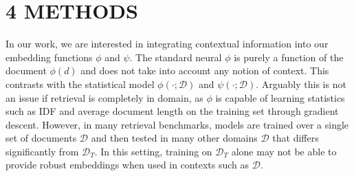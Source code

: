 \section*{4 METHODS}
In our work, we are interested in integrating contextual information into our embedding functions \(\phi\) and \(\psi\). The standard neural \(\phi\) is purely a function of the document \(\phi(d)\) and does not take into account any notion of context. This contrasts with the statistical model \(\phi(\cdot ; \mathcal{D})\) and \(\psi(\cdot ; \mathcal{D})\). Arguably this is not an issue if retrieval is completely in domain, as \(\phi\) is capable of learning statistics such as IDF and average document length on the training set through gradient descent.
However, in many retrieval benchmarks, models are trained over a single set of documents \(\mathcal{D}\) and then tested in many other domains \(\mathcal{D}\) that differs significantly from \(\mathcal{D}_{T}\). In this setting, training on \(\mathcal{D}_{T}\) alone may not be able to provide robust embeddings when used in contexts such as \(\mathcal{D}\).
